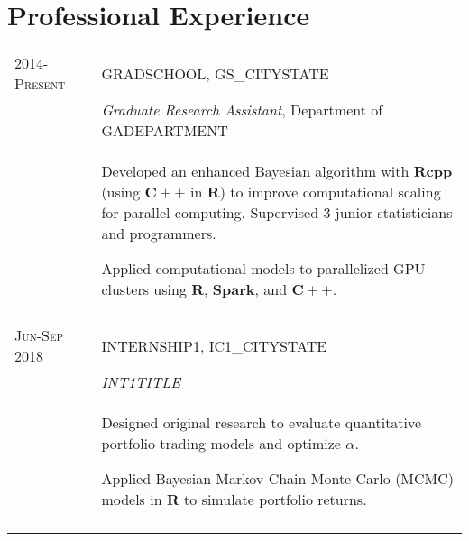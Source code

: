 \documentclass[a4paper,10pt]{article}
\begin{document}
\section{Professional Experience}
\begin{supertabular}{l p{0.55cm} p{13.9cm}}
	\textsc{2014-Present}				&& \textsc{GRADSCHOOL}, GS_CITYSTATE \\
	\small\textsc{}							&& \small	\emph{Graduate Research Assistant}, \small Department of GADEPARTMENT \\
															&& \begin{enumerate*}[label =$\diamond$,itemjoin={\newline}]
																	\item \footnotesize Developed an enhanced Bayesian algorithm with $\mathbf{Rcpp}$ (using $\mathbf{C++}$ in $\mathbf{R}$) to improve computational scaling for parallel computing. Supervised 3 junior statisticians and programmers.
																	\item \footnotesize Applied computational models to parallelized GPU clusters using $\mathbf{R}$, $\mathbf{Spark}$, and $\mathbf{C++}$.
																	\end{enumerate*} \vspace{0mm} \\

	 \\

	\textsc{Jun-Sep 2018}	&& \textsc{INTERNSHIP1}, IC1_CITYSTATE \\
												&& \small	\emph{INT1TITLE} \\
												&& \begin{enumerate*}[label =$\diamond$, itemjoin={\newline}]
													\item \footnotesize Designed original research to evaluate quantitative portfolio trading models and optimize $\alpha$.
													\item \footnotesize Applied Bayesian Markov Chain Monte Carlo (MCMC) models in $\mathbf{R}$ to simulate portfolio returns.	\end{enumerate*} \\
	 \\





\end{supertabular}
\end{document}
